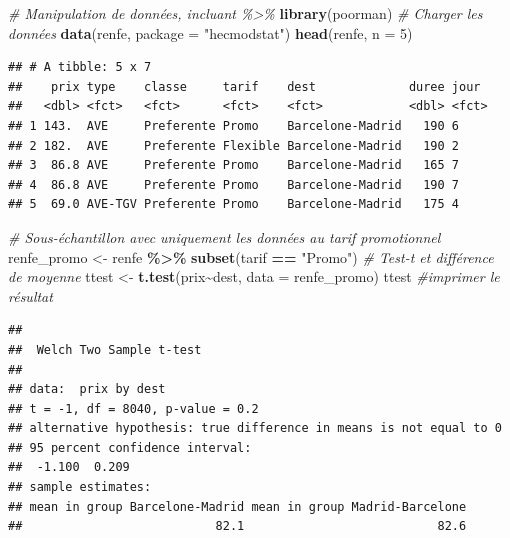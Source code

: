 \documentclass[
  11pt,
  letterpaper,
]{article}
\newenvironment{Shaded}{\begin{snugshade}}{\end{snugshade}}
\newcommand{\CommentTok}[1]{\textcolor[rgb]{0.56,0.35,0.01}{\textit{#1}}}
\newcommand{\DataTypeTok}[1]{\textcolor[rgb]{0.13,0.29,0.53}{#1}}
\newcommand{\DecValTok}[1]{\textcolor[rgb]{0.00,0.00,0.81}{#1}}
\newcommand{\KeywordTok}[1]{\textcolor[rgb]{0.13,0.29,0.53}{\textbf{#1}}}
\newcommand{\NormalTok}[1]{#1}
\newcommand{\OperatorTok}[1]{\textcolor[rgb]{0.81,0.36,0.00}{\textbf{#1}}}
\newcommand{\StringTok}[1]{\textcolor[rgb]{0.31,0.60,0.02}{#1}}
\theoremstyle{definition}
\theoremstyle{definition}
\theoremstyle{definition}
\theoremstyle{remark}
\begin{document}
\begin{Shaded}
\begin{Highlighting}[]
\CommentTok{\# Manipulation de données, incluant \%\textgreater{}\%}
\KeywordTok{library}\NormalTok{(poorman)}
\CommentTok{\# Charger les données}
\KeywordTok{data}\NormalTok{(renfe, }\DataTypeTok{package =} \StringTok{"hecmodstat"}\NormalTok{)}
\KeywordTok{head}\NormalTok{(renfe, }\DataTypeTok{n =} \DecValTok{5}\NormalTok{)}
\end{Highlighting}
\end{Shaded}

\begin{verbatim}
## # A tibble: 5 x 7
##    prix type    classe     tarif    dest             duree jour 
##   <dbl> <fct>   <fct>      <fct>    <fct>            <dbl> <fct>
## 1 143.  AVE     Preferente Promo    Barcelone-Madrid   190 6    
## 2 182.  AVE     Preferente Flexible Barcelone-Madrid   190 2    
## 3  86.8 AVE     Preferente Promo    Barcelone-Madrid   165 7    
## 4  86.8 AVE     Preferente Promo    Barcelone-Madrid   190 7    
## 5  69.0 AVE-TGV Preferente Promo    Barcelone-Madrid   175 4
\end{verbatim}

\begin{Shaded}
\begin{Highlighting}[]
\CommentTok{\# Sous{-}échantillon avec uniquement les données au tarif promotionnel}
\NormalTok{renfe\_promo \textless{}{-}}\StringTok{ }\NormalTok{renfe }\OperatorTok{\%\textgreater{}\%}\StringTok{ }\KeywordTok{subset}\NormalTok{(tarif }\OperatorTok{==}\StringTok{ "Promo"}\NormalTok{)}
\CommentTok{\# Test{-}t et différence de moyenne}
\NormalTok{ttest \textless{}{-}}\StringTok{ }\KeywordTok{t.test}\NormalTok{(prix}\OperatorTok{\textasciitilde{}}\NormalTok{dest, }\DataTypeTok{data =}\NormalTok{ renfe\_promo)}
\NormalTok{ttest }\CommentTok{\#imprimer le résultat}
\end{Highlighting}
\end{Shaded}

\begin{verbatim}
## 
## 	Welch Two Sample t-test
## 
## data:  prix by dest
## t = -1, df = 8040, p-value = 0.2
## alternative hypothesis: true difference in means is not equal to 0
## 95 percent confidence interval:
##  -1.100  0.209
## sample estimates:
## mean in group Barcelone-Madrid mean in group Madrid-Barcelone 
##                           82.1                           82.6
\end{verbatim}
\end{document}
